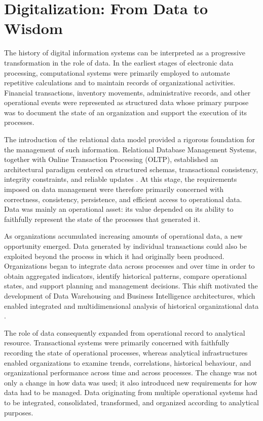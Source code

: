 \section{Digitalization: From Data to Wisdom}
\label{sec:digitalization_data_knowledge}

The history of digital information systems can be interpreted as a progressive transformation in the role of data. In the earliest stages of electronic data processing, computational systems were primarily employed to automate repetitive calculations and to maintain records of organizational activities. Financial transactions, inventory movements, administrative records, and other operational events were represented as structured data whose primary purpose was to document the state of an organization and support the execution of its processes.

The introduction of the relational data model provided a rigorous foundation for the management of such information. Relational Database Management Systems, together with Online Transaction Processing (OLTP), established an architectural paradigm centered on structured schemas, transactional consistency, integrity constraints, and reliable updates \cite{codd1970,gray1992}. At this stage, the requirements imposed on data management were therefore primarily concerned with correctness, consistency, persistence, and efficient access to operational data. Data was mainly an operational asset: its value depended on its ability to faithfully represent the state of the processes that generated it.

As organizations accumulated increasing amounts of operational data, a new opportunity emerged. Data generated by individual transactions could also be exploited beyond the process in which it had originally been produced. Organizations began to integrate data across processes and over time in order to obtain aggregated indicators, identify historical patterns, compare operational states, and support planning and management decisions. This shift motivated the development of Data Warehousing and Business Intelligence architectures, which enabled integrated and multidimensional analysis of historical organizational data \cite{inmon1992,kimball2002}.

The role of data consequently expanded from operational record to analytical resource. Transactional systems were primarily concerned with faithfully recording the state of operational processes, whereas analytical infrastructures enabled organizations to examine trends, correlations, historical behaviour, and organizational performance across time and across processes. The change was not only a change in how data was used; it also introduced new requirements for how data had to be managed. Data originating from multiple operational systems had to be integrated, consolidated, transformed, and organized according to analytical purposes.

